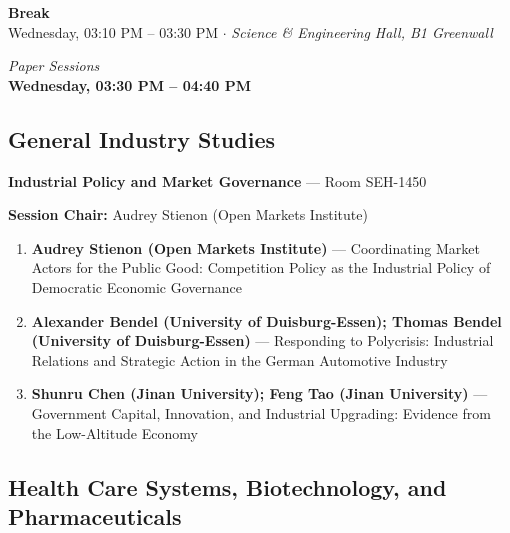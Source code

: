 \documentclass[
  10pt,
  letterpaper,
  DIV=11,
  numbers=noendperiod]{scrartcl}
\begin{document}
\vspace{1em}


\begin{center}
\colorbox{event!15}{\parbox{0.9\linewidth}{\centering
  \textcolor{event}{\large\textbf{Break}}\\[2pt]
  {\small Wednesday, 03:10 PM – 03:30 PM $\cdot$ \textit{Science \& Engineering Hall, B1 Greenwall}}
}}
\end{center}

\vspace{1em}


\begin{center}
\normalsize\textit{Paper Sessions}\\[0.3em]
\Large\textbf{Wednesday, 03:30 PM – 04:40 PM}
\end{center}

\subsection{\texorpdfstring{\textcolor{gis}{General Industry Studies}}{}}\label{section-7}

\textbf{Industrial Policy and Market Governance} --- Room SEH-1450

\textbf{Session Chair:} Audrey Stienon (Open Markets Institute)

\begin{enumerate}
\def\labelenumi{\arabic{enumi}.}
\item
  \textbf{Audrey Stienon (Open Markets Institute)} --- Coordinating
  Market Actors for the Public Good: Competition Policy as the
  Industrial Policy of Democratic Economic Governance
\item
  \textbf{Alexander Bendel (University of Duisburg-Essen); Thomas Bendel
  (University of Duisburg-Essen)} --- Responding to Polycrisis:
  Industrial Relations and Strategic Action in the German Automotive
  Industry
\item
  \textbf{Shunru Chen (Jinan University); Feng Tao (Jinan University)}
  --- Government Capital, Innovation, and Industrial Upgrading: Evidence
  from the Low-Altitude Economy
\end{enumerate}

\subsection{\texorpdfstring{\textcolor{health}{Health Care Systems, Biotechnology, and Pharmaceuticals}}{}}\label{section-8}
\end{document}
